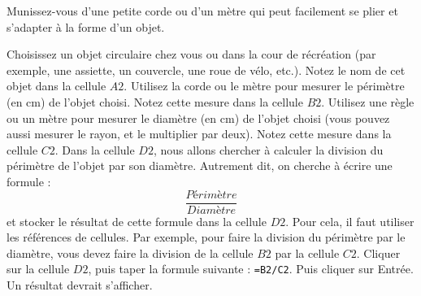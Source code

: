 \documentclass{exam}
\begin{document}
Munissez-vous d'une petite corde ou d'un mètre qui peut facilement se plier et s'adapter à la forme d'un objet.

\begin{questions}
  \question Choisissez un objet circulaire chez vous ou dans la cour de récréation (par exemple, une assiette, un couvercle, une roue de vélo, etc.). Notez le nom de cet objet dans la cellule $A2$.
  \question Utilisez la corde ou le mètre pour mesurer le périmètre (en cm) de l'objet choisi. Notez cette mesure dans la cellule $B2$.
  \question Utilisez une règle ou un mètre pour mesurer le diamètre (en cm) de l'objet choisi (vous pouvez aussi mesurer le rayon, et le multiplier par deux). Notez cette mesure dans la cellule $C2$.
  \question Dans la cellule $D2$, nous allons chercher à calculer la division du périmètre de l'objet par son diamètre. Autrement dit, on cherche à écrire une formule : 
  \[
  \frac{Périmètre}{Diamètre}
  \]
  et stocker le résultat de cette formule dans la cellule $D2$. Pour cela, il faut utiliser les références de cellules. Par exemple, pour faire la division du périmètre par le diamètre, vous devez faire la division de la cellule $B2$ par la cellule $C2$. Cliquer sur la cellule $D2$, puis taper la formule suivante : \verb|=B2/C2|. Puis cliquer sur Entrée. Un résultat devrait s'afficher.


\end{questions}
\end{document}

